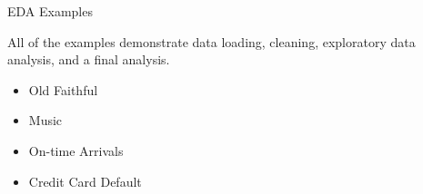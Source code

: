 \documentclass[11pt]{beamer}
\begin{document}
\begin{frame}{
	\begin{minipage}[t]{0.55\textwidth}
		EDA Examples
	\end{minipage}
	\hfill
	\begin{minipage}[t]{0.35\textwidth}
		\flushright
	\end{minipage}
}{}
All of the examples demonstrate data loading, cleaning, exploratory data analysis, and a final analysis.
\begin{itemize}
	\item Old Faithful
	\item Music
	\item On-time Arrivals
	\item Credit Card Default
\end{itemize}

\end{frame}
\end{document}
